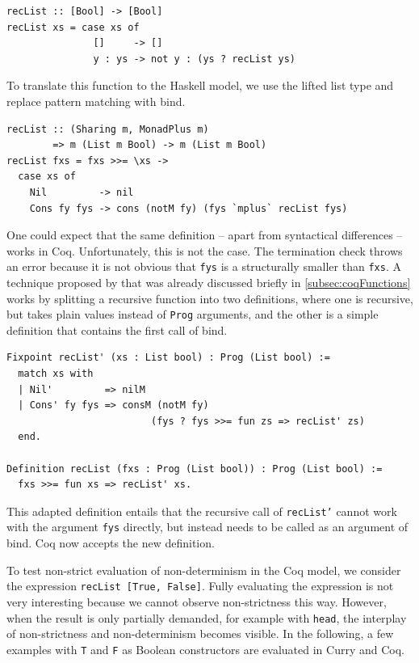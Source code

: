 \documentclass[a4paper, 11pt, fleqn, twoside]{scrreprt}
\newcommand{\hinl}[1]{\texttt{#1}}
\newcommand{\cinl}[1]{\texttt{#1}}
\begin{document}
\begin{verbatim}
recList :: [Bool] -> [Bool]
recList xs = case xs of
               []     -> []
               y : ys -> not y : (ys ? recList ys)
\end{verbatim}

To translate this function to the Haskell model, we use the lifted list type and replace pattern matching with bind.

\begin{verbatim}
recList :: (Sharing m, MonadPlus m) 
        => m (List m Bool) -> m (List m Bool)
recList fxs = fxs >>= \xs ->
  case xs of
    Nil         -> nil
    Cons fy fys -> cons (notM fy) (fys `mplus` recList fys)
\end{verbatim}

One could expect that the same definition -- apart from syntactical differences -- works in Coq.
Unfortunately, this is not the case.
The termination check throws an error because it is not obvious that \hinl{fys} is a structurally smaller than \hinl{fxs}.
A technique proposed by \citet{dylus2019oneMonad} that was already discussed briefly in \autoref{subsec:coqFunctions} works by splitting a recursive function into two definitions, where one is recursive, but takes plain values instead of \cinl{Prog} arguments, and the other is a simple definition that contains the first call of bind.

\begin{verbatim}
Fixpoint recList' (xs : List bool) : Prog (List bool) :=
  match xs with
  | Nil'         => nilM
  | Cons' fy fys => consM (notM fy)
                         (fys ? fys >>= fun zs => recList' zs)
  end.

Definition recList (fxs : Prog (List bool)) : Prog (List bool) :=
  fxs >>= fun xs => recList' xs.
\end{verbatim}

This adapted definition entails that the recursive call of \hinl{recList'} cannot work with the argument \cinl{fys} directly, but instead needs to be called as an argument of bind.
Coq  now accepts the new definition.

To test non-strict evaluation of non-determinism in the Coq model, we consider the expression \hinl{recList [True, False]}.
Fully evaluating the expression is not very interesting because we cannot observe non-strictness this way.
However, when the result is only partially demanded, for example with \cinl{head}, the interplay of non-strictness and non-determinism becomes visible.
In the following, a few examples with \hinl{T} and \hinl{F} as Boolean constructors are evaluated in Curry and Coq.
\end{document}
